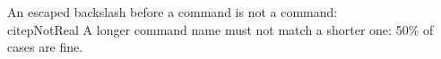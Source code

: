 \documentclass{article}
\begin{document}
An escaped backslash before a command is not a command: \\citep{NotReal}
A longer command name must not match a shorter one: 
50\% of cases are fine.
\end{document}

